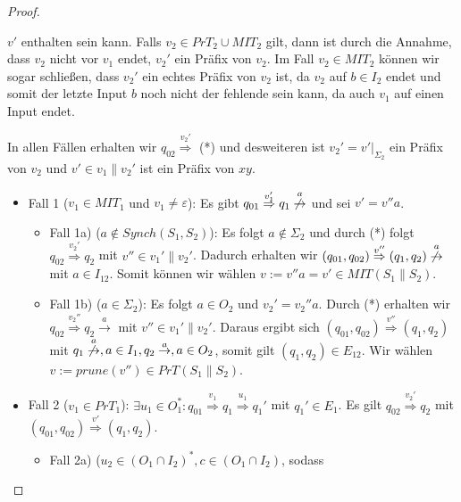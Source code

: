 \begin{proof}
\begin{itemize}
      $v'$ enthalten sein kann. Falls $v_2\in
      PrT_2\cup MIT_2$ gilt, dann ist durch die Annahme, dass $v_2$ nicht vor
      $v_1$ endet, $v_2'$ ein Präfix von $v_2$. Im Fall $v_2\in MIT_2$ können
      wir sogar schließen, dass $v_2'$ ein echtes Präfix von $v_2$ ist, da
      $v_2$ auf $b\in I_2$ endet und somit der letzte Input $b$ noch nicht der
      fehlende sein kann, da auch $v_1$ auf einen Input endet.
  \end{itemize}
  In allen Fällen erhalten wir $q_{02}\overset{v_2'}{\Rightarrow}$ (*) und
  desweiteren ist $v_2'=v'|_{\Sigma _2}$ ein Präfix von $v_2$ und $v'\in v_1\|
  v_2'$ ist ein Präfix von $xy$.
  \begin{itemize}
    \item Fall 1 ($v_1\in MIT_1$ und $v_1\neq\varepsilon$): Es gibt $q_{01}
      \overset{v_1'}{\Rightarrow}q_1
      \overset{a}{\not{\hspace{-0.1cm}\rightarrow}}$ und sei $v'=v''a$.
      \begin{itemize}
        \item Fall 1a) ($a\notin Synch(S_1,S_2)$): Es folgt $a\notin
          \Sigma _2$ und durch (*) folgt $q_{02} \overset{v_2'}{\Rightarrow}
          q_2$ mit $v''\in v_1'\|v_2'$. Dadurch erhalten
          wir $(q_{01},q_{02}) \overset{v''}{\Rightarrow} (q_1,q_2)
          \overset{a}{\not{\hspace{-0.1cm}\rightarrow}}$ mit $a\in I_{12}$.
          Somit können wir wählen $v:=v''a=v'\in MIT(S_1\|S_2)$.
        \item Fall 1b) ($a\in\Sigma _2$): Es folgt $a\in O_2$ und
          $v_2'=v_2''a$. Durch (*) erhalten wir $q_{02}
          \overset{v_2''}{\Rightarrow} q_2 \overset{a}{\rightarrow}$ mit
          $v''\in v_1'\|v_2'$. Daraus ergibt sich $(q_{01},q_{02})
          \overset{v''}{\Rightarrow} (q_1,q_2)$ mit $q_1
          \overset{a}{\not{\hspace{-0.1cm}\rightarrow}},a\in I_1, q_2
          \overset{a}{\rightarrow},a\in O_2$, somit gilt $(q_1,q_2)\in
          E_{12}$. Wir wählen $v:=prune(v'')\in PrT(S_1\|S_2)$.
      \end{itemize}
  \item Fall 2 ($v_1\in PrT_1$): $\exists u_1\in O_1^*:q_{01}
    \overset{v_1}{\Rightarrow} q_1 \overset{u_1}{\Rightarrow} q_1'$ mit
    $q_1'\in E_1$. Es gilt $q_{02} \overset{v_2'}{\Rightarrow}q_2$ mit
    $(q_{01},q_{02}) \overset{v'}{\Rightarrow}(q_1,q_2)$.
    \begin{itemize}
      \item Fall 2a) ($u_2\in (O_1\cap I_2)^*, c\in (O_1\cap I_2)$, sodass

\end{itemize}
\end{itemize}
\end{proof}

